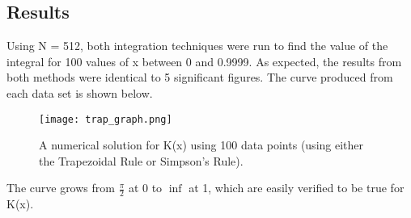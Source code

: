 \documentclass{article}
\begin{document}
\subsection{Results}
Using N = 512, both integration techniques were run to find the value of the integral for 100 values of x between 0 and 0.9999. As expected, the results from both methods were identical to 5 significant figures. The curve produced from each data set is shown below.
\begin{figure}[H]
  \centering
  \texttt{[image: trap\_graph.png]}
  \caption{A numerical solution for K(x) using 100 data points (using either the Trapezoidal Rule or Simpson's Rule).}
  \label{fig:nonfloat}
\end{figure}
The curve grows from $\frac{\pi}{2}$ at 0 to $\inf$ at 1, which are easily verified to be true for K(x).


\end{document}
